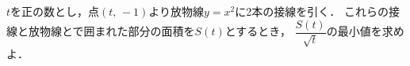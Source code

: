 \documentclass[../../main.tex]{subfiles}
\begin{document}
$t$を正の数とし，点$(t, \, -1)$より放物線$y=x^2$に2本の接線を引く．
これらの接線と放物線とで囲まれた部分の面積を$S(t)$とするとき，
$\displaystyle\dfrac{S(t)}{\sqrt{t}}$の最小値を求めよ．
\end{document}

